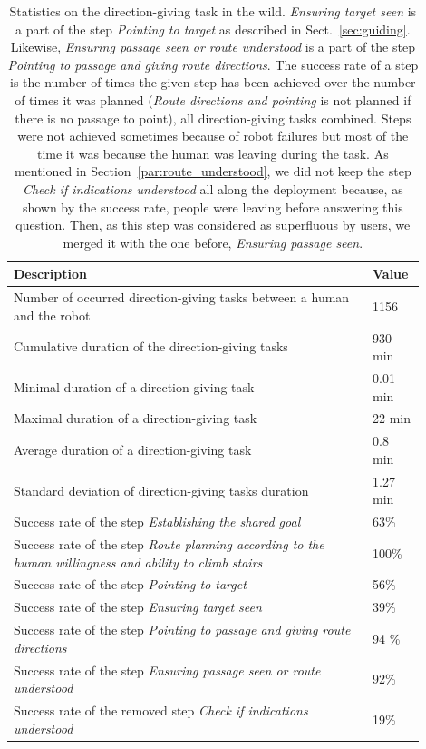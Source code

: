 \documentclass[a4paper,11pt,twoside]{StyleThese}
\begin{document}
\begin{table}[htp]
	\centering
	\begin{tabular}{p{0.8\linewidth}|p{0.1\linewidth}}
		\hline
		Description & Value \\ 
		\hline
		Number of occurred direction-giving tasks between a human and the robot &  1156 \\ 
		Cumulative duration of the direction-giving tasks & 930 min\\ 
		Minimal duration of a direction-giving task & 0.01 min \\ 
		Maximal duration of a direction-giving task & 22 min \\
		Average duration of a direction-giving task & 0.8 min \\
		Standard deviation of direction-giving tasks duration & 1.27 min \\
		Success rate of the step \emph{Establishing the shared goal} & 63\% \\
		Success rate of the step \emph{Route planning according to the human willingness and ability to climb stairs} & 100\% \\
		Success rate of the step \emph{Pointing to target} & 56\% \\
		Success rate of the step \emph{Ensuring target seen} & 39\% \\
		Success rate of the step \emph{Pointing to passage and giving route directions} & 94 \% \\
		Success rate of the step \emph{Ensuring passage seen or route understood} & 92\% \\
		Success rate of the removed step \emph{Check if indications understood} & 19\% \\
		\hline
	\end{tabular}
	\caption{Statistics on the direction-giving task in the wild. \emph{Ensuring target seen} is a part of the step \emph{Pointing to target} as described in Sect.~\ref{sec:guiding}. Likewise,  \emph{Ensuring passage seen or route understood} is a part of the step \emph{Pointing to passage and giving route directions}. The success rate of a step is the number of times the given step has been achieved over the number of times it was planned (\eg \emph{Route directions and pointing} is not planned if there is no passage to point), all direction-giving tasks combined. Steps were not achieved sometimes because of robot failures but most of the time it was because the human was leaving during the task. As mentioned in Section~\ref{par:route_understood}, we did not keep the step \emph{Check if indications understood} all along the deployment because, as shown by the success rate, people were leaving before answering this question. Then, as this step was considered as superfluous by users, we merged it with the one before, \emph{Ensuring passage seen}.}
	\label{tab:stats_tasks}
\end{table}
\end{document}
